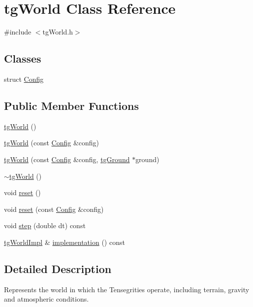 \hypertarget{classtg_world}{\section{tg\-World Class Reference}
\label{classtg_world}
}


{\ttfamily \#include $<$tg\-World.\-h$>$}

\subsection*{Classes}
\begin{DoxyCompactItemize}
\item 
struct \hyperlink{structtg_world_1_1_config}{Config}
\end{DoxyCompactItemize}
\subsection*{Public Member Functions}
\begin{DoxyCompactItemize}
\item 
\hyperlink{classtg_world_af71f7c0c5516173079cb3c7e8b28e015}{tg\-World} ()
\item 
\hyperlink{classtg_world_aaf344a85c8ae0b3b90b201b37c8a2a57}{tg\-World} (const \hyperlink{structtg_world_1_1_config}{Config} \&config)
\item 
\hyperlink{classtg_world_a015dcc7c703a957e5ec15b64364f5991}{tg\-World} (const \hyperlink{structtg_world_1_1_config}{Config} \&config, \hyperlink{classtg_ground}{tg\-Ground} $\ast$ground)
\item 
\hyperlink{classtg_world_ade8a3eb52e6df6129415bcf4915b5a75}{$\sim$tg\-World} ()
\item 
void \hyperlink{classtg_world_a0bab7a52bf7a0f900bba2ec50c1c3c9d}{reset} ()
\item 
void \hyperlink{classtg_world_af62d0597509479954c7b6bd541951e50}{reset} (const \hyperlink{structtg_world_1_1_config}{Config} \&config)
\item 
void \hyperlink{classtg_world_ac659156f5f0680451085b7cdb3ac1311}{step} (double dt) const 
\item 
\hyperlink{classtg_world_impl}{tg\-World\-Impl} \& \hyperlink{classtg_world_a08b9677036559211e2b86dcb1141f7bf}{implementation} () const 
\end{DoxyCompactItemize}


\subsection{Detailed Description}
Represents the world in which the Tensegrities operate, including terrain, gravity and atmospheric conditions. 


